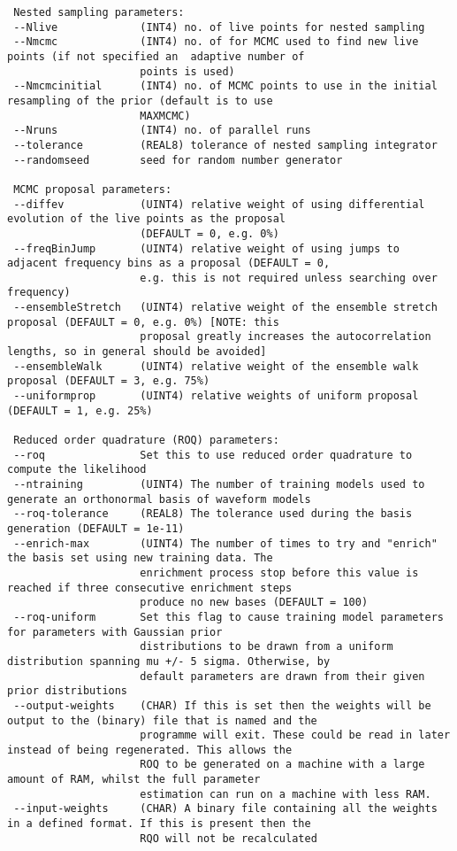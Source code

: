 \begin{footnotesize}
\begin{verbatim}
 Nested sampling parameters:
 --Nlive             (INT4) no. of live points for nested sampling
 --Nmcmc             (INT4) no. of for MCMC used to find new live points (if not specified an  adaptive number of
                     points is used)
 --Nmcmcinitial      (INT4) no. of MCMC points to use in the initial resampling of the prior (default is to use
                     MAXMCMC)
 --Nruns             (INT4) no. of parallel runs
 --tolerance         (REAL8) tolerance of nested sampling integrator
 --randomseed        seed for random number generator

 MCMC proposal parameters:
 --diffev            (UINT4) relative weight of using differential evolution of the live points as the proposal
                     (DEFAULT = 0, e.g. 0%)
 --freqBinJump       (UINT4) relative weight of using jumps to adjacent frequency bins as a proposal (DEFAULT = 0,
                     e.g. this is not required unless searching over frequency)
 --ensembleStretch   (UINT4) relative weight of the ensemble stretch proposal (DEFAULT = 0, e.g. 0%) [NOTE: this
                     proposal greatly increases the autocorrelation lengths, so in general should be avoided]
 --ensembleWalk      (UINT4) relative weight of the ensemble walk proposal (DEFAULT = 3, e.g. 75%)
 --uniformprop       (UINT4) relative weights of uniform proposal (DEFAULT = 1, e.g. 25%)

 Reduced order quadrature (ROQ) parameters:
 --roq               Set this to use reduced order quadrature to compute the likelihood
 --ntraining         (UINT4) The number of training models used to generate an orthonormal basis of waveform models
 --roq-tolerance     (REAL8) The tolerance used during the basis generation (DEFAULT = 1e-11)
 --enrich-max        (UINT4) The number of times to try and "enrich" the basis set using new training data. The
                     enrichment process stop before this value is reached if three consecutive enrichment steps
                     produce no new bases (DEFAULT = 100)
 --roq-uniform       Set this flag to cause training model parameters for parameters with Gaussian prior
                     distributions to be drawn from a uniform distribution spanning mu +/- 5 sigma. Otherwise, by
                     default parameters are drawn from their given prior distributions
 --output-weights    (CHAR) If this is set then the weights will be output to the (binary) file that is named and the
                     programme will exit. These could be read in later instead of being regenerated. This allows the
                     ROQ to be generated on a machine with a large amount of RAM, whilst the full parameter
                     estimation can run on a machine with less RAM.
 --input-weights     (CHAR) A binary file containing all the weights in a defined format. If this is present then the
                     RQO will not be recalculated


\end{verbatim}
\end{footnotesize}
